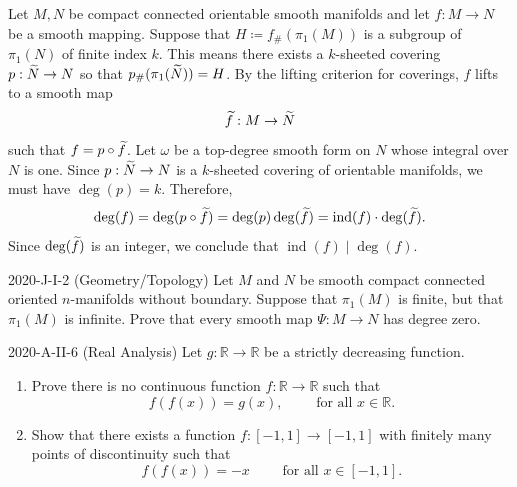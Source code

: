 \documentclass{article}
\begin{document}
\begin{solutions}
	Let $M, N$ be compact connected orientable smooth manifolds and let $f: M \to N$ be a smooth mapping. Suppose that $H \coloneqq f_{\#}(\pi_{1}(M))$ is a subgroup of $\pi_{1}(N)$ of finite index $k$. This means there exists a $k$-sheeted covering $p: \widetilde{N} \to N$ so that $p_{\#}(\pi_{1}(\widetilde{N})) = H$. By the lifting criterion for coverings, $f$ lifts to a smooth map 
		\begin{equation}
			\widetilde{f}: M \to \widetilde{N}
		\end{equation}
	such that $f = p \circ \widetilde{f}$. Let $\omega$ be a top-degree smooth form on $N$ whose integral over $N$ is one. Since $p: \widetilde{N} \to N$ is a $k$-sheeted covering of orientable manifolds, we must have $\deg(p) = k$. Therefore, 
		\begin{equation}
			\deg(f) = \deg(p \circ \widetilde{f}) = \deg(p)\deg(\widetilde{f}) = \operatorname{ind}(f) \cdot \deg(\widetilde{f}). 
		\end{equation}
	Since $\deg(\widetilde{f})$ is an integer, we conclude that $\operatorname{ind}(f) \mid \deg(f)$. 
\end{solutions}
\begin{prb}{2020-J-I-2 (Geometry/Topology)}
	Let $M$ and $N$ be smooth compact connected oriented $n$-manifolds without boundary. Suppose that $\pi_{1}(M)$ is finite, but that $\pi_{1}(M)$ is infinite. Prove that every smooth map $\Psi: M \to N$ has degree zero. 
\end{prb}
\begin{prb}{2020-A-II-6 (Real Analysis)}
	Let $g: \mathbb{R} \to \mathbb{R}$ be a strictly decreasing function. \vspace{-0.35cm}
		\begin{enumerate}[itemsep =-2pt,label = (\alph{*})]
			\item Prove there is no continuous function $f: \mathbb{R} \to \mathbb{R}$ such that 
				\begin{equation*}
					f(f(x)) = g(x), \qquad \text{ for all $x \in \mathbb{R}$}. 
				\end{equation*}
			\item Show that there exists a function $f: [-1,1] \to [-1,1]$ with finitely many points of discontinuity such that $$f(f(x)) =-x \qquad \text{ for all $x \in [-1,1]$}.$$
		\end{enumerate}
\end{prb}
\end{document}
